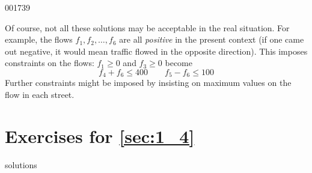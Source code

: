 \begin{example}{}{001739}
\begin{solution}
Of course, not all these solutions may be acceptable in the real situation. For example, the flows $ f_1, f_2, \dots , f_6 $ are all \textit{positive} in the present context (if one came out negative, it would mean traffic flowed in the opposite direction). This imposes constraints on the flows: $f_1 \geq 0$ and $f_3 \geq 0$ become
\begin{equation*}
f_4 + f_6 \leq 400 \quad\quad f_5 - f_6 \leq 100
\end{equation*}
Further constraints might be imposed by insisting on maximum values on the flow in each street.
\end{solution}
\end{example}

\section*{Exercises for \ref{sec:1_4}}

\begin{Filesave}{solutions}
\end{Filesave}

